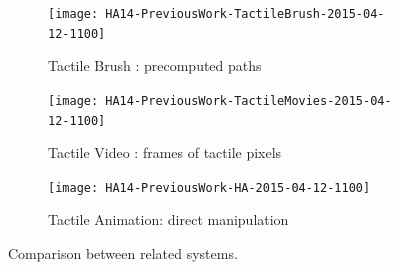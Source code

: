 %
%
%

\newcommand\prevWorkWidth{1.25in}
\newcommand\prevWorkImageWidth{1.1in}


\begin{figure}[t]
 \centering
   \begin{subfigure}[t]{\prevWorkWidth}
	  \centering
	   \texttt{[image: HA14-PreviousWork-TactileBrush-2015-04-12-1100]} 
	   \caption{Tactile Brush \cite{Israr2011a}: precomputed paths}
	   \label{fig:prevwork:tactilebrush}
    \end{subfigure}
    \qquad
  \begin{subfigure}[t]{\prevWorkWidth}
  	\centering
	   \texttt{[image: HA14-PreviousWork-TactileMovies-2015-04-12-1100]} 
	   \caption{Tactile Video \cite{Kim2009}: frames of tactile pixels}
	   \label{fig:prevwork:tactilemovies}
    \end{subfigure}
	\qquad
      \begin{subfigure}[t]{\prevWorkWidth}
	      \centering
	   \texttt{[image: HA14-PreviousWork-HA-2015-04-12-1100]} 
	   \caption{Tactile Animation: direct manipulation}
	   \label{fig:prevwork:ha}
    \end{subfigure}
    \caption{Comparison between related systems.}
    \label{fig:tactileanimation:prevwork}
\end{figure}




